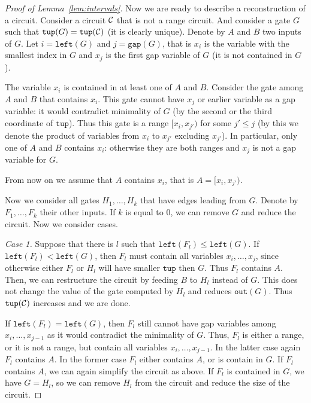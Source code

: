 \documentclass[11pt,letterpaper]{article}
\newcommand{\lef}{\texttt{left}}
\newcommand{\gap}{\texttt{gap}}
\newcommand{\out}{\texttt{out}}
\newcommand{\tup}{\texttt{tup}}
\begin{document}
\begin{proof}[Proof of Lemma~\ref{lem:intervals}]
Now we are ready to describe a reconstruction of a circuit. Consider a circuit ${\cal C}$ that is not a range circuit. And consider a gate $G$ such that $\tup(G)=\tup({\cal C})$ (it is clearly unique). Denote by $A$ and $B$ two inputs of $G$. Let $i=\lef(G)$ and $j=\gap(G)$, that is $x_i$ is the variable with the smallest index in $G$ and $x_j$ is the first gap variable of $G$ (it is not contained in $G$).

The variable $x_i$ is contained in at least one of $A$ and $B$. Consider the gate among $A$ and $B$ that contains $x_i$. This gate cannot have $x_j$ or earlier variable as a gap variable: it would contradict minimality of $G$ (by the second or the third coordinate of $\tup$). Thus this gate is a range $[x_i,x_{j'})$ for some $j'\leq j$ (by this we denote the product of variables from $x_i$ to $x_{j'}$ excluding $x_{j'}$). In particular, only one of $A$ and $B$ contains $x_i$: otherwise they are both ranges and $x_j$ is not a gap variable for $G$.

From now on we assume that $A$ contains $x_i$, that is $A=[x_i,x_{j'})$.

Now we consider all gates $H_1,\ldots, H_k$ that have edges leading from $G$. Denote by $F_1,\ldots, F_k$ their other inputs. If $k$ is equal to $0$, we can remove $G$ and reduce the circuit. Now we consider cases.

\emph{Case 1.} Suppose that there is $l$ such that $\lef(F_l) \leq \lef(G)$. If $\lef(F_l) < \lef(G)$, then $F_l$ must contain all variables $x_i, \ldots, x_j$, since otherwise either $F_l$ or $H_l$ will have smaller $\tup$ then $G$. Thus $F_l$ contains $A$. Then, we can restructure the circuit by feeding $B$ to $H_l$ instead of $G$. This does not change the value of the gate computed by $H_l$ and reduces $\out(G)$. Thus $\tup({\cal C})$ increases and we are done.

If $\lef(F_l) = \lef(G)$, then $F_l$ still cannot have gap variables among $x_i, \ldots, x_{j-1}$ as it would contradict the minimality of $G$. Thus, $F_l$ is either a range, or it is not a range, but contain all variables $x_i, \ldots, x_{j-1}$. In the latter case again $F_l$ contains $A$. In the former case $F_l$ either contains $A$, or is contain in $G$. If $F_l$ contains $A$, we can again simplify the circuit as above. If $F_l$ is contained in $G$, we have $G=H_l$, so we can remove $H_l$ from the circuit and reduce the size of the circuit.


\end{proof}
\end{document}
